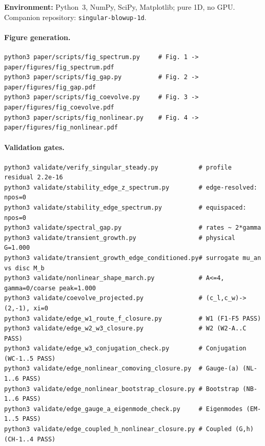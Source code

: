 \documentclass[11pt,a4paper]{article}
\begin{document}
\textbf{Environment:} Python~3, NumPy, SciPy, Matplotlib; pure 1D, no GPU.
Companion repository: \texttt{singular-blowup-1d}.

\paragraph{Figure generation.}
{\small
\begin{verbatim}
python3 paper/scripts/fig_spectrum.py     # Fig. 1 -> paper/figures/fig_spectrum.pdf
python3 paper/scripts/fig_gap.py          # Fig. 2 -> paper/figures/fig_gap.pdf
python3 paper/scripts/fig_coevolve.py     # Fig. 3 -> paper/figures/fig_coevolve.pdf
python3 paper/scripts/fig_nonlinear.py    # Fig. 4 -> paper/figures/fig_nonlinear.pdf
\end{verbatim}
}

\paragraph{Validation gates.}
{\small
\begin{verbatim}
python3 validate/verify_singular_steady.py           # profile residual 2.2e-16
python3 validate/stability_edge_z_spectrum.py        # edge-resolved: npos=0
python3 validate/stability_edge_spectrum.py          # equispaced: npos=0
python3 validate/spectral_gap.py                     # rates ~ 2*gamma
python3 validate/transient_growth.py                 # physical G=1.000
python3 validate/transient_growth_edge_conditioned.py# surrogate mu_an vs disc M_b
python3 validate/nonlinear_shape_march.py            # A<=4, gamma=0/coarse peak=1.000
python3 validate/coevolve_projected.py               # (c_l,c_w)->(2,-1), xi=0
python3 validate/edge_w1_route_f_closure.py          # W1 (F1-F5 PASS)
python3 validate/edge_w2_w3_closure.py               # W2 (W2-A..C PASS)
python3 validate/edge_w3_conjugation_check.py        # Conjugation (WC-1..5 PASS)
python3 validate/edge_nonlinear_comoving_closure.py  # Gauge-(a) (NL-1..6 PASS)
python3 validate/edge_nonlinear_bootstrap_closure.py # Bootstrap (NB-1..6 PASS)
python3 validate/edge_gauge_a_eigenmode_check.py     # Eigenmodes (EM-1..5 PASS)
python3 validate/edge_coupled_h_nonlinear_closure.py # Coupled (G,h) (CH-1..4 PASS)
\end{verbatim}
}
\end{document}
